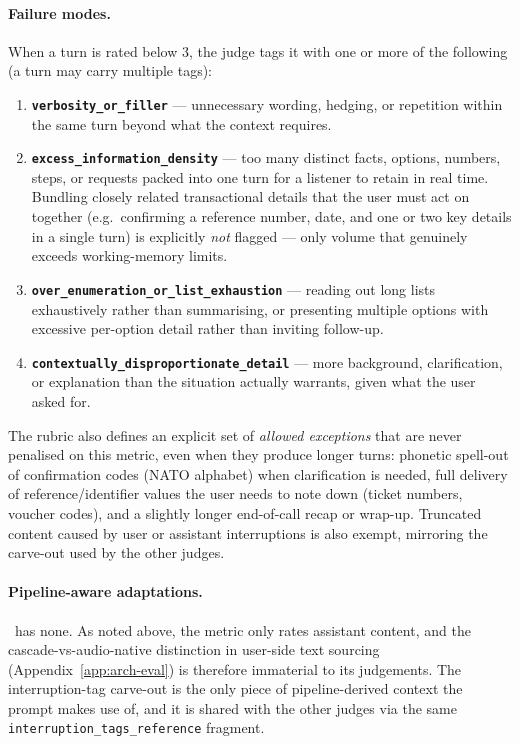 \paragraph{Failure modes.} When a turn is rated below 3, the judge tags it with one or more of the following (a turn may carry multiple tags):
\begin{enumerate}
    \item \textbf{\texttt{verbosity\_or\_filler}} --- unnecessary wording, hedging, or repetition within the same turn beyond what the context requires.
    \item \textbf{\texttt{excess\_information\_density}} --- too many distinct facts, options, numbers, steps, or requests packed into one turn for a listener to retain in real time. Bundling closely related transactional details that the user must act on together (e.g.\ confirming a reference number, date, and one or two key details in a single turn) is explicitly \emph{not} flagged --- only volume that genuinely exceeds working-memory limits.
    \item \textbf{\texttt{over\_enumeration\_or\_list\_exhaustion}} --- reading out long lists exhaustively rather than summarising, or presenting multiple options with excessive per-option detail rather than inviting follow-up.
    \item \textbf{\texttt{contextually\_disproportionate\_detail}} --- more background, clarification, or explanation than the situation actually warrants, given what the user asked for.
\end{enumerate}
The rubric also defines an explicit set of \emph{allowed exceptions} that are never penalised on this metric, even when they produce longer turns: phonetic spell-out of confirmation codes (NATO alphabet) when clarification is needed, full delivery of reference/identifier values the user needs to note down (ticket numbers, voucher codes), and a slightly longer end-of-call recap or wrap-up. Truncated content caused by user or assistant interruptions is also exempt, mirroring the carve-out used by the other judges.

\paragraph{Pipeline-aware adaptations.} \metricconcise~has none. As noted above, the metric only rates assistant content, and the cascade-vs-audio-native distinction in user-side text sourcing (Appendix~\ref{app:arch-eval}) is therefore immaterial to its judgements. The interruption-tag carve-out is the only piece of pipeline-derived context the prompt makes use of, and it is shared with the other judges via the same \texttt{interruption\_tags\_reference} fragment.

